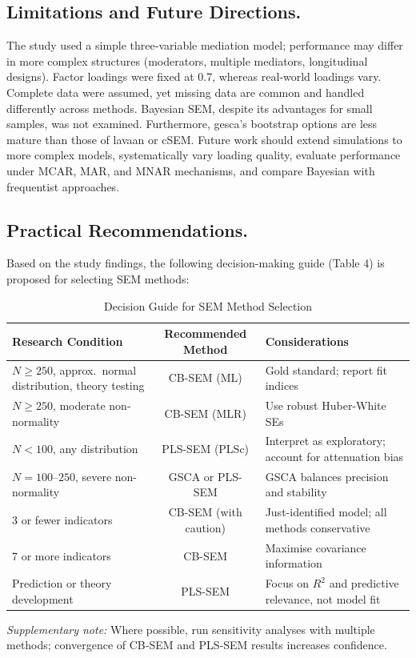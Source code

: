 \documentclass[twoside]{article}
\begin{document}
\subsection{Limitations and Future Directions.}
The study used a simple three‑variable mediation model; performance may differ in more complex structures (moderators, multiple mediators, longitudinal designs). Factor loadings were fixed at 0.7, whereas real‑world loadings vary. Complete data were assumed, yet missing data are common and handled differently across methods. Bayesian SEM, despite its advantages for small samples, was not examined. Furthermore, gesca’s bootstrap options are less mature than those of lavaan or cSEM. Future work should extend simulations to more complex models, systematically vary loading quality, evaluate performance under MCAR, MAR, and MNAR mechanisms, and compare Bayesian with frequentist approaches.
\vspace{-1\baselineskip}
\subsection{Practical Recommendations.}
Based on the study findings, the following decision-making guide (Table 4) is proposed for selecting SEM methods:

\begin{table}[H]
	\centering
	\caption{Decision Guide for SEM Method Selection}
	\label{tab:decision}
	\begin{tabularx}{\textwidth}{X c X}
		\toprule
		\textbf{Research Condition} & \textbf{Recommended Method} & \textbf{Considerations} \\
		\midrule
		$N \geq 250$, approx.\ normal distribution, theory testing & CB-SEM (ML) & Gold standard; report fit indices \\
		$N \geq 250$, moderate non-normality & CB-SEM (MLR) & Use robust Huber-White SEs \\
		$N < 100$, any distribution & PLS-SEM (PLSc) & Interpret as exploratory; account for attenuation bias \\
		$N = 100$--$250$, severe non-normality & GSCA or PLS-SEM & GSCA balances precision and stability \\
		3 or fewer indicators & CB-SEM (with caution) & Just-identified model; all methods conservative \\
		7 or more indicators & CB-SEM & Maximise covariance information \\
		Prediction or theory development & PLS-SEM & Focus on $R^2$ and predictive relevance, not model fit \\
		\bottomrule
	\end{tabularx}
	
	\vspace{0.5\baselineskip}
	\begin{minipage}{\textwidth}
		\small\emph{Supplementary note:} Where possible, run sensitivity analyses with multiple methods; convergence of CB‑SEM and PLS‑SEM results increases confidence.
	\end{minipage}
\end{table}
\end{document}
